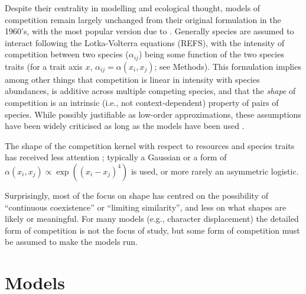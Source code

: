 \documentclass[a4paper,11pt]{article}
\begin{document}
Despite their centrality in modelling and ecological thought, models
of competition remain largely unchanged from their original
formulation in the 1960's, with the most popular version due to
\citet{MacArthur-1967}.
Generally species are assumed to interact following the Lotka-Volterra
equations (REFS), with the intensity of competition between two
species ($\alpha_{ij}$) being some function of the two species traits
(for a trait axis $x$, $\alpha_{ij} = \alpha(x_i, x_j)$; see Methods).
%
This formulation implies among other things that competition is linear
in intensity with species abundances, is additive across multiple
competing species, and that the \emph{shape} of competition is an
intrinsic (i.e., not context-dependent) property of pairs of species.
%
While possibly justifiable as low-order approximations, these
assumptions have been widely criticised as long as the models have
been used
\citep[e.g.][]{Andrewartha-1953,May-1972,Abrams-1975}.
%

The shape of the competition kernel with respect to resources and
species traits has received less attention \citep[but
see][]{Abrams-2008,Leimar-2013}; typically a Gaussian or a form of
$\alpha(x_i, x_j) \propto \exp((x_i - x_j)^4)$ is used, or more rarely
an asymmetric logistic.
%

%
Surprisingly, most of the focus on shape has centred on the
possibility of ``continuous coexistence'' or ``limiting similarity'',
and less on what shapes are likely or meaningful.
For many models (e.g., character displacement) the detailed form of
competition is not the focus of study, but some form of competition
must be assumed to make the models run.
%







\section{Models}
\end{document}
